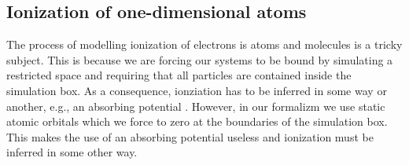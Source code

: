         \subsection{Ionization of one-dimensional atoms}
            The process of modelling ionization of electrons is atoms and
            molecules is a tricky subject.
            This is because we are forcing our systems to be bound by simulating
            a restricted space and requiring that all particles are contained
            inside the simulation box.
            As a consequence, ionziation has to be inferred in some way or
            another, e.g., an absorbing potential \cite{kosloff1986363,
            miyagi_and_madsen}.
            However, in our formalizm we use static atomic orbitals which we
            force to zero at the boundaries of the simulation box.
            This makes the use of an absorbing potential useless and ionization
            must be inferred in some other way.

